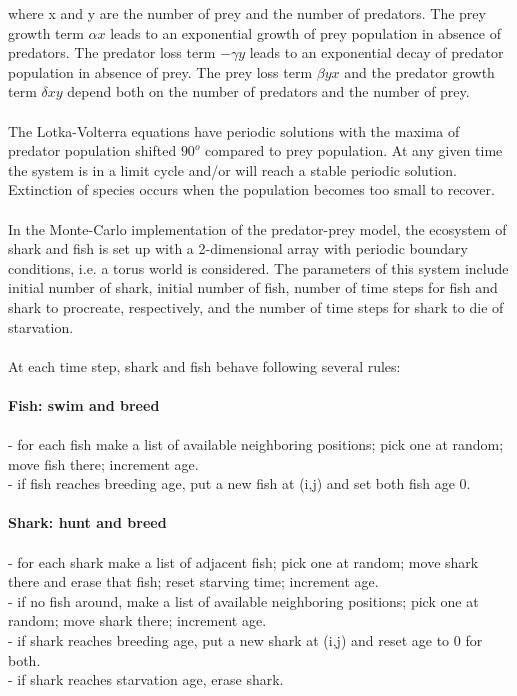 \documentclass{article}
\begin{document}
where x and y are the number of prey and the number of predators. The prey growth term $\alpha x$ leads to an exponential growth of prey population in absence of predators. The predator loss term $- \gamma y$ leads to an exponential decay of predator population in absence of prey. The prey loss term $\beta yx$ and the predator growth term $\delta xy$ depend both on the number of predators and the number of prey.\\
\\
The Lotka-Volterra equations have periodic solutions with the maxima of predator population shifted $90^{o}$ compared to prey population. At any given time the system is in a limit cycle and/or will reach a stable periodic solution. Extinction of species occurs when the population becomes too small to recover.\\
\\
In the Monte-Carlo implementation of the predator-prey model, the ecosystem of shark and fish is set up with a 2-dimensional array with periodic boundary conditions, i.e. a torus world is considered. The parameters of this system include initial number of shark, initial number of fish, number of time steps for fish and shark to procreate, respectively, and the number of time steps for shark to die of starvation.\\
\\
At each time step, shark and fish behave following several rules:\\
\\
\textbf{Fish: swim and breed}\\
\\
- for each fish make a list of available neighboring positions; pick one at random; move fish there; increment age.\\
- if fish reaches breeding age, put a new fish at (i,j) and set both fish age 0.\\
\\
\textbf{Shark: hunt and breed}\\
\\
- for each shark make a list of adjacent fish; pick one at random; move shark there and erase that fish; reset starving time; increment age.\\
- if no fish around, make a list of available neighboring positions; pick one at random; move shark there; increment age.\\
- if shark reaches breeding age, put a new shark at (i,j) and reset age to 0 for both.\\
- if shark reaches starvation age, erase shark.\\
\end{document}
